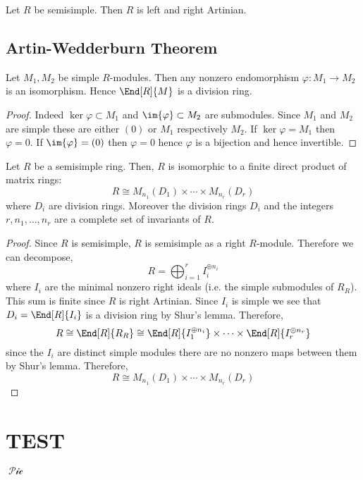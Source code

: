 \documentclass[12pt]{article}
\begin{document}
\begin{prop}
Let $R$ be semisimple. Then $R$ is left and right Artinian. 
\end{prop}


\subsection{Artin-Wedderburn Theorem}

\begin{lemma}[Shur]
Let $M_1, M_2$ be simple $R$-modules. Then any nonzero endomorphism $\varphi : M_1 \to M_2$ is an isomorphism. Hence $\End[R]{M}$ is a division ring.
\end{lemma}

\begin{proof}
Indeed $\ker{\varphi} \subset M_1$ and $\im{\varphi} \subset M_2$ are submodules. Since $M_1$ and $M_2$ are simple these are either $(0)$ or $M_1$ respectively $M_2$. If $\ker{\varphi} = M_1$ then $\varphi = 0$. If $\im{\varphi} = (0)$ then $\varphi = 0$ hence $\varphi$ is a bijection and hence invertible.
\end{proof}


\begin{theorem}
Let $R$ be a semisimple ring. Then, $R$ is isomorphic to a finite direct product of matrix rings:
\[ R \cong M_{n_1}(D_1) \times \cdots \times M_{n_r}(D_r) \]
where $D_i$ are division rings. Moreover the division rings $D_i$ and the integers $r, n_1, \dots, n_r$ are a complete set of invariants of $R$.
\end{theorem}

\begin{proof}
Since $R$ is semisimple, $R$ is semisimple as a right $R$-module. Therefore we can decompose,
\[ R = \bigoplus_{i = 1}^r I_i^{\oplus n_i} \]
where $I_i$ are the minimal nonzero right ideals (i.e. the simple submodules of $R_R$). This sum is finite since $R$ is right Artinian. Since $I_i$ is simple we see that $D_i = \End[R]{I_i}$ is a division ring by Shur's lemma. Therefore,
\[ R \cong \End[R]{R_R} \cong \End[R]{I_1^{\oplus n_i}} \times \cdots \times \End[R]{I_r^{\oplus n_r}} \]
since the $I_i$ are distinct simple modules there are no nonzero maps between them by Shur's lemma. Therefore,
\[ R \cong M_{n_1}(D_1) \times \cdots \times M_{n_r}(D_r) \]
\end{proof}

\section{TEST}

$\mathop{\mathscr{Pic}}$
\end{document}
